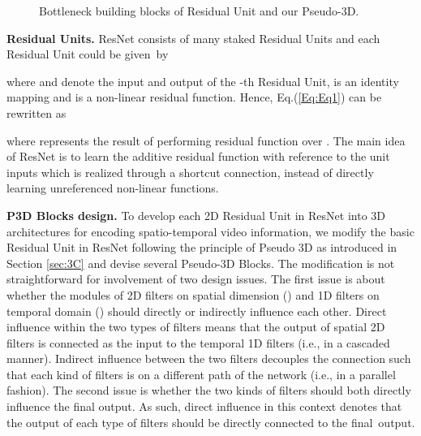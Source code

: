 \documentclass[10pt,twocolumn,letterpaper]{article}
\begin{document}
\begin{figure*}[!tb]
   \centering
   \caption{\small Bottleneck building blocks of Residual Unit and our Pseudo-3D.}
   \label{fig:fig2}
   \vspace{-0.18in}
\end{figure*}

\textbf{Residual Units.}
ResNet consists of many staked Residual Units and each Residual Unit could be given~by

where  and  denote the input and output of the -th Residual Unit,  is an identity mapping and  is a non-linear residual function. Hence, Eq.(\ref{Eq:Eq1}) can be rewritten as

where  represents the result of performing residual function  over . The main idea of ResNet is to learn the additive residual function  with reference to the unit inputs  which is realized through a shortcut connection, instead of directly learning unreferenced non-linear functions.

\textbf{P3D Blocks design.}
To develop each 2D Residual Unit in ResNet into 3D architectures for encoding spatio-temporal video information, we modify the basic Residual Unit in ResNet following the principle of Pseudo 3D as introduced in Section \ref{sec:3C} and devise several Pseudo-3D Blocks. The modification is not straightforward for involvement of two design issues. The first issue is about whether the modules of 2D filters on spatial dimension () and 1D filters on temporal domain () should directly or indirectly influence each other. Direct influence within the two types of filters means that the output of spatial 2D filters is connected as the input to the temporal 1D filters (i.e., in a cascaded manner). Indirect influence between the two filters decouples the connection such that each kind of filters is on a different path of the network (i.e., in a parallel fashion). The second issue is whether the two kinds of filters should both directly influence the final output. As such, direct influence in this context denotes that the output of each type of filters should be directly connected to the final~output.
\end{document}
